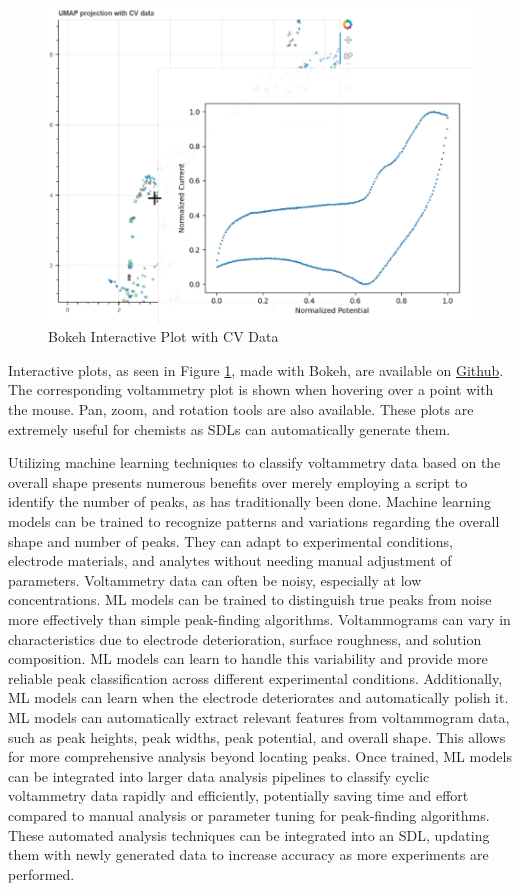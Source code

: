 \begin{figure}[h!]
  \centering
    \includegraphics[width=1.0\textwidth]{figures/bokeh.png}
    \caption{Bokeh Interactive Plot with CV Data}
    \label{bokeh}
\end{figure}
Interactive plots, as seen in Figure \ref{bokeh}, made with Bokeh, are available on \href{https://github.com/raineyfu/Thesis}{Github}. The corresponding voltammetry plot is shown when hovering over a point with the mouse. Pan, zoom, and rotation tools are also available. These plots are extremely useful for chemists as SDLs can automatically generate them.

Utilizing machine learning techniques to classify voltammetry data based on the overall shape presents numerous benefits over merely employing a script to identify the number of peaks, as has traditionally been done. Machine learning models can be trained to recognize patterns and variations regarding the overall shape and number of peaks. They can adapt to experimental conditions, electrode materials, and analytes without needing manual adjustment of parameters. Voltammetry data can often be noisy, especially at low concentrations. ML models can be trained to distinguish true peaks from noise more effectively than simple peak-finding algorithms. Voltammograms can vary in characteristics due to electrode deterioration, surface roughness, and solution composition. ML models can learn to handle this variability and provide more reliable peak classification across different experimental conditions. Additionally, ML models can learn when the electrode deteriorates and automatically polish it. ML models can automatically extract relevant features from voltammogram data, such as peak heights, peak widths, peak potential, and overall shape. This allows for more comprehensive analysis beyond locating peaks. Once trained, ML models can be integrated into larger data analysis pipelines to classify cyclic voltammetry data rapidly and efficiently, potentially saving time and effort compared to manual analysis or parameter tuning for peak-finding algorithms. These automated analysis techniques can be integrated into an SDL, updating them with newly generated data to increase accuracy as more experiments are performed.

